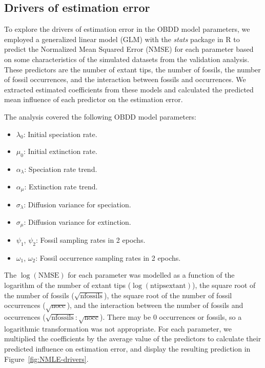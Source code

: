 \documentclass[oupdraft]{sysbio}
\begin{document}
\begin{appendices}
\section{Drivers of estimation error} \label{SM-NMLE}

To explore the drivers of estimation error in the OBDD model parameters, we employed a generalized linear model (GLM) with the \textit{stats} package in R \citep{r_core_team_r_2018} to predict the Normalized Mean Squared Error (NMSE) for each parameter based on some characteristics of the simulated datasets from the validation analysis. These predictors are the number of extant tips, the number of fossils, the number of fossil occurrences, and the interaction between fossils and occurrences. We extracted estimated coefficients from these models and calculated the predicted mean influence of each predictor on the estimation error.

The analysis covered the following OBDD model parameters:
\begin{itemize}
    \item $\lambda_0$: Initial speciation rate.
    \item $\mu_0$: Initial extinction rate.
    \item $\alpha_{\lambda}$: Speciation rate trend.
    \item $\alpha_{\mu}$: Extinction rate trend.
    \item $\sigma_{\lambda}$: Diffusion variance for speciation.
    \item $\sigma_{\mu}$: Diffusion variance for extinction.
    \item $\psi_1$, $\psi_2$: Fossil sampling rates in 2 epochs.
    \item $\omega_1$, $\omega_2$: Fossil occurrence sampling rates in 2 epochs.
\end{itemize}

The $\log(\text{NMSE})$ for each parameter was modelled as a function of the logarithm of the number of extant tips ($\log(\text{ntipsextant})$), the square root of the number of fossils ($\sqrt{\text{nfossils}}$), the square root of the number of fossil occurrences ($\sqrt{\text{nocc}}$), and the interaction between the number of fossils and occurrences ($\sqrt{\text{nfossils}}:\sqrt{\text{nocc}}$). There may be 0 occurrences or fossils, so a logarithmic transformation was not appropriate. For each parameter, we multiplied the coefficients by the average value of the predictors to calculate their predicted influence on estimation error, and display the resulting prediction in Figure~\ref{fig:NMLE-drivers}.


\end{appendices}
\end{document}
